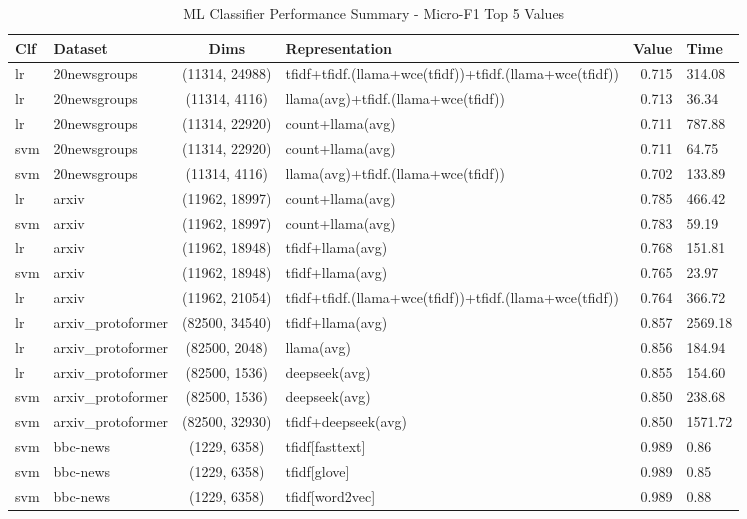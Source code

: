 \documentclass[final]{clv2025-revised}
\begin{document}
\begin{table}[h!]
\centering
\scriptsize
\caption{ML Classifier Performance Summary - Micro-F1 Top 5 Values}
\label{tab:ml_classifier_summary_micro_f1}
\begin{tabular}{@{}p{.7cm} p{1.8cm} c >{\raggedright\arraybackslash}p{5.8cm} r p{1.0cm}@{}}
\toprule
\textbf{Clf} & \textbf{Dataset} & \textbf{Dims} & \textbf{Representation} & \textbf{Value} & \textbf{Time} \\
\midrule
lr & 20newsgroups & (11314, 24988) & tfidf+tfidf.(llama+wce(tfidf))+tfidf.(llama+wce(tfidf)) & 0.715 & 314.08 \\
lr & 20newsgroups & (11314, 4116) & llama(avg)+tfidf.(llama+wce(tfidf)) & 0.713 & 36.34 \\
lr & 20newsgroups & (11314, 22920) & count+llama(avg) & 0.711 & 787.88 \\
svm & 20newsgroups & (11314, 22920) & count+llama(avg) & 0.711 & 64.75 \\
svm & 20newsgroups & (11314, 4116) & llama(avg)+tfidf.(llama+wce(tfidf)) & 0.702 & 133.89 \\
\midrule
lr & arxiv & (11962, 18997) & count+llama(avg) & 0.785 & 466.42 \\
svm & arxiv & (11962, 18997) & count+llama(avg) & 0.783 & 59.19 \\
lr & arxiv & (11962, 18948) & tfidf+llama(avg) & 0.768 & 151.81 \\
svm & arxiv & (11962, 18948) & tfidf+llama(avg) & 0.765 & 23.97 \\
lr & arxiv & (11962, 21054) & tfidf+tfidf.(llama+wce(tfidf))+tfidf.(llama+wce(tfidf)) & 0.764 & 366.72 \\
\midrule
lr & arxiv\_protoformer & (82500, 34540) & tfidf+llama(avg) & 0.857 & 2569.18 \\
lr & arxiv\_protoformer & (82500, 2048) & llama(avg) & 0.856 & 184.94 \\
lr & arxiv\_protoformer & (82500, 1536) & deepseek(avg) & 0.855 & 154.60 \\
svm & arxiv\_protoformer & (82500, 1536) & deepseek(avg) & 0.850 & 238.68 \\
svm & arxiv\_protoformer & (82500, 32930) & tfidf+deepseek(avg) & 0.850 & 1571.72 \\
\midrule
svm & bbc-news & (1229, 6358) & tfidf[fasttext] & 0.989 & 0.86 \\
svm & bbc-news & (1229, 6358) & tfidf[glove] & 0.989 & 0.85 \\
svm & bbc-news & (1229, 6358) & tfidf[word2vec] & 0.989 & 0.88 \\

\end{tabular}
\end{table}
\end{document}

